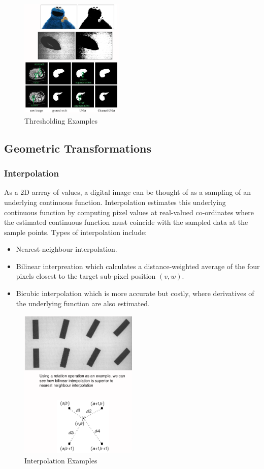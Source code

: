\documentclass[a4paper,11pt]{article}
\begin{document}
\begin{figure}[H]
    \centering
    \includegraphics[width=0.44\textwidth]{images/thresholding_examples.png}
    \caption{Thresholding Examples}
\end{figure}

\subsection{Geometric Transformations}
\subsubsection{Interpolation}
As a 2D arrray of values, a digital image can be thought of as a sampling of an underlying continuous function.
Interpolation estimates this underlying continuous function by computing pixel values at real-valued co-ordinates where the estimated continuous function must coincide with the sampled data at the sample points.
Types of interpolation include:
\begin{itemize}
    \item   Nearest-neighbour interpolation.
    \item   Bilinear interpreation which calculates a distance-weighted average of the four pixels closest to the target sub-pixel position $(v,w)$.
    \item   Bicubic interpolation which is more accurate but costly, where derivatives of the underlying function are also estimated.
\end{itemize}

\begin{figure}[H]
    \centering
    \includegraphics[width=0.5\textwidth]{images/interpolation_examples.png}
    \caption{Interpolation Examples}
\end{figure}
\end{document}
